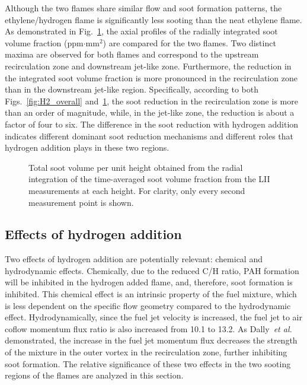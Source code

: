 \documentclass[review,3p,times]{elsarticle}
\begin{document}
Although the two flames share similar flow and soot formation patterns, the ethylene/hydrogen flame is significantly less sooting than the neat ethylene flame.  As demonstrated in Fig.~\ref{fig:ifv}, the axial profiles of the radially integrated soot volume fraction (ppm$\cdot$mm$^2$) are compared for the two flames.  Two distinct maxima are observed for both flames and correspond to the upstream recirculation zone and downstream jet-like zone.  Furthermore, the reduction in the integrated soot volume fraction is more pronounced in the recirculation zone than in the downstream jet-like region.  Specifically, according to both Figs.~\ref{fig:H2_overall} and~\ref{fig:ifv}, the soot reduction in the recirculation zone is more than an order of magnitude, while, in the jet-like zone, the reduction is about a factor of four to six.  The difference in the soot reduction with hydrogen addition indicates different \textcolor{Rv1}{dominant} soot reduction mechanisms and different roles that hydrogen addition plays in these two regions.  

\begin{figure}[t]
  \centering
  \scriptsize
  \vspace{-0.10in}
  \resizebox{0.5\textwidth}{!}{}
  \normalsize
  \vspace{-0.3in}
  \caption{Total soot volume per unit height obtained from the radial integration of the time-averaged soot volume fraction from the LII measurements at each height.  For clarity, only every second measurement point is shown.}
  \label{fig:ifv}
\end{figure}


\subsection{Effects of hydrogen addition}

Two effects of hydrogen addition are potentially relevant: chemical and hydrodynamic effects.  Chemically, due to the reduced C/H ratio, PAH formation will be inhibited in the hydrogen added flame, and, therefore, soot formation is inhibited.  \textcolor{Rv1}{This chemical effect is an intrinsic property of the fuel mixture, which is less dependent on the specific flow geometry compared to the hydrodynamic effect.  }Hydrodynamically, since the fuel jet velocity is increased, the fuel jet to air coflow momentum flux ratio is also increased\textcolor{Rv1}{ from 10.1 to 13.2}.  As Dally~\emph{et al.}~\cite{dally98b} demonstrated, the increase in the fuel jet momentum flux decreases the strength of the mixture in the outer vortex in the recirculation zone, further inhibiting soot formation.  The relative significance of these two effects in the two sooting regions of the flames are analyzed in this section.
\end{document}
